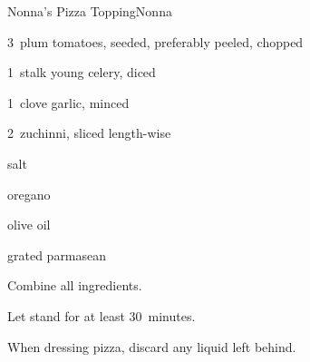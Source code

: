 \begin{recipe}{Nonna's Pizza Topping}{Nonna}{}

\begin{ingredients}
\item 3~plum tomatoes, seeded, preferably peeled, chopped
\item 1~stalk young celery, diced
\item 1~clove garlic, minced
\item 2~zuchinni, sliced length-wise
\item salt
\item oregano
\item olive oil
\item grated parmasean
\end{ingredients}

\begin{directions}
\item Combine all ingredients.
\item Let stand for at least 30~minutes.
\item When dressing pizza, discard any liquid left behind.
\end{directions}

\end{recipe}
